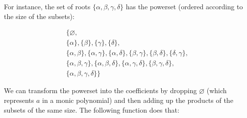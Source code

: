 \documentclass[tikz]{scrreprt}
\begin{document}
For instance, the set of roots 
$\lbrace\alpha,\beta,\gamma,\delta\rbrace$
has the powerset (ordered according
to the size of the subsets):

\begin{minipage}{\textwidth}
\begin{gather*}
\lbrace
\varnothing,\\
\lbrace\alpha\rbrace,
\lbrace\beta \rbrace,
\lbrace\gamma\rbrace,
\lbrace\delta\rbrace,\\
\lbrace\alpha,\beta\rbrace,
\lbrace\alpha,\gamma\rbrace,
\lbrace\alpha,\delta\rbrace,
\lbrace\beta,\gamma\rbrace,
\lbrace\beta,\delta\rbrace,
\lbrace\delta,\gamma\rbrace,\\
\lbrace\alpha,\beta,\gamma\rbrace,
\lbrace\alpha,\beta,\delta\rbrace,
\lbrace\alpha,\gamma,\delta\rbrace,
\lbrace\beta,\gamma,\delta\rbrace,\\
\lbrace\alpha,\beta,\gamma,\delta\rbrace
\rbrace
\end{gather*}
\end{minipage}

We can transform the powerset into 
the coefficients by
dropping $\varnothing$ (which 
represents $a$ in a monic polynomial)
and then adding up the products of
the subsets of the same size. 
The following function
does that:
\end{document}
